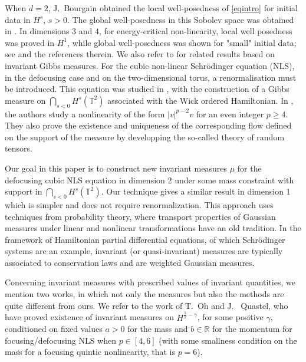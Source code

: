 \documentclass[11pt,leqno]{amsart}
\newcommand{\R}{\mathbb{R}}
\newcommand{\T}{\mathbb{T}}
\begin{document}
 When $d=2$, J.~Bourgain \cite{B93} obtained the local well-posedness of \eqref{eqintro} for initial data in $H^s$, $s>0$. 
The global well-posedness in this Sobolev space was obtained in \cite{herr2024strichartz}. %
In dimensions $3$ and $4$, for  energy-critical non-linearity,  local well posedness was proved  in $H^1$, while
global well-posedness was shown for "small" initial data; see \cite{MR3512894} and the references therein. 
We also refer to \cite{Sta} for related results based on invariant Gibbs measures.
For  the cubic non-linear Schr\"odinger equation (NLS), in the defocusing case and on the two-dimensional torus, a renormalisation must be introduced. 
This equation was studied in \cite{B96}, with the construction of a Gibbs measure on $\bigcap_{s<0} H^s(\T^2)$ associated with the Wick ordered Hamiltonian. 
In \cite{DNY}, the authors study a nonlinearity of the form $|v|^{p-2} v$ for an even integer $p\geq 4$. They also prove
  the existence and uniqueness of the corresponding flow defined on the
 support of the measure by developping the so-called theory of random tensors.
\bigskip

Our goal in this paper is to construct new invariant measures $\mu$ for the defocusing cubic NLS equation in dimension 2 under some mass constraint with support in
$\bigcap_{s<0} H^s(\T^2)$. 
Our technique gives a similar result in dimension 1 which is simpler and does not require renormalization. 
This approach uses techniques from probability theory, where transport properties of Gaussian measures under linear and nonlinear transformations have an old tradition.
 In the framework of Hamiltonian partial differential equations, of which Schr\"odinger systems are an example,
  invariant (or quasi-invariant) measures are typically associated to conservation laws and are weighted Gaussian measures.



Concerning invariant measures with prescribed values of invariant quantities, we mention two works, in which not only the measures but also the methods are quite different from ours.
We refer to the work \cite{OQ} of  T.~Oh and J. ~Quastel, who have proved 
existence of  invariant measures on $H^{\frac{1}{2}-\gamma}$, for some positive $\gamma$, conditioned on fixed values $a>0$ for the  mass and $b\in \R$ 
for the momentum for focusing/defocusing NLS when $p\in [4,6]$  
(with some smallness condition on the mass for a focusing 
quintic nonlinearity, that is $p=6$). 
\end{document}
